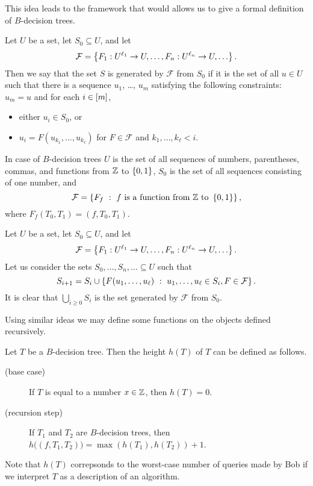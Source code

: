 This idea leads to the framework that would allows us to give a formal
definition of $B$-decision trees.
\begin{definition}
  Let $U$ be a set, let $S_0 \subseteq U$, and let
  \[
    \mathcal{F} =
    \set{F_1 : U^{\ell_1} \to U, \dots, F_n : U^{\ell_n} \to U, \dots}.
  \]
  Then we say that the set $S$ is generated by $\mathcal{F}$ from $S_0$ if 
  it is the set of all $u \in U$ such that there is a sequence
  $u_1$, \dots, $u_m$ satisfying the following constraints: $u_m = u$ and
  for each $i \in {[{m}]}$,
  \begin{itemize}
    \item either $u_i \in S_0$, or
    \item $u_i = F(u_{k_1}, \dots, u_{k_\ell})$
      for $F \in \mathcal{F}$ and $k_1, \dots, k_\ell < i$.
  \end{itemize}
\end{definition}
In case of $B$-decision trees $U$ is the set of all sequences of numbers,
parentheses, commas, and functions from ${\mathbb{Z}}$ to $\set{0, 1}$,
$S_0$ is the set of all sequences consisting of one number, and
\[
  \mathcal{F} =
  \set[
    {
      f \text{ is a function from } \Z
        \text{ to } \set{0, 1}
    }
  ]{F_f},
\]
where $F_f(T_0, T_1) = (f, T_0, T_1)$.

\begin{remark}
  Let $U$ be a set, let $S_0 \subseteq U$, and let
  \[
    \mathcal{F} =
    \set{F_1 : U^{\ell_1} \to U, \dots, F_n : U^{\ell_n} \to U, \dots}.
  \]
  Let us consider the sets $S_0, \dots, S_n, \dots \subseteq U$ such that 
  \[
    S_{i + 1} = S_i \cup 
    \set[u_1, \dots, u_\ell \in S_i, F \in \mathcal{F}]{F(u_1, \dots, u_\ell)}.
  \]
  It is clear that $\bigcup_{i \ge 0} S_i$ is the set generated by $\mathcal{F}$
  from $S_0$.
\end{remark}

Using similar ideas we may define some functions on the objects defined
recursively.
\begin{definition}
  Let $T$ be a $B$-decision tree. Then the height $h(T)$ of $T$ can be
  defined as follows.
  \begin{description}
    \item [(base case)] If $T$ is equal to a number $x \in {\mathbb{Z}}$, then $h(T) = 0$.
    \item[(recursion step)] If $T_1$ and $T_2$ are $B$-decision trees, then
      $h\big((f, T_1, T_2)\big) = \max(h(T_1), h(T_2)) + 1$.
  \end{description}
\end{definition}
Note that $h(T)$ correpsonds to the worst-case number of queries made by Bob if
we interpret $T$ as a description of an algorithm.

